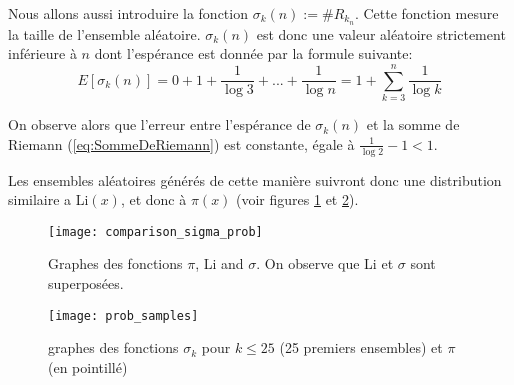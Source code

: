 \documentclass[../main.tex]{report}
\begin{document}
Nous allons aussi introduire la fonction $\sigma_k(n) := \# R_{k_n}$. Cette fonction mesure la taille de l'ensemble aléatoire.\newline
$\sigma_k(n)$ est donc une valeur aléatoire strictement inférieure à $n$ dont l'espérance est donnée par la formule suivante:
\begin{equation}
\label{eq:esperance}
E[\sigma_k(n)] = 0 + 1 + \frac{1}{\log 3} + ... + \frac{1}{\log n}
= 1 + \sum_{k=3}^{n} \frac{1}{\log k}
\end{equation}

On observe alors que l'erreur entre l'espérance de $\sigma_k(n)$ et la somme de Riemann (\ref{eq:SommeDeRiemann}) est constante, égale à
$\frac{1}{\log 2}- 1 < 1$.

Les ensembles aléatoires générés de cette manière suivront donc une distribution similaire a Li$(x)$, et donc à $\pi(x)$
(voir figures \ref{fig:comparison_sigma_prob} et \ref{fig:prob_sample}).

\begin{figure}[H]
\texttt{[image: comparison\_sigma\_prob]}

\caption{Graphes des fonctions $\pi$, Li and $\sigma$. On observe que Li et $\sigma$ sont superposées.}
\label{fig:comparison_sigma_prob}
\end{figure}

\begin{figure}[H]
	\centering
	\texttt{[image: prob\_samples]}
	\caption{graphes des fonctions $\sigma_k$ pour $k \leq 25$ (25 premiers ensembles) et $\pi$ (en pointillé)}
	\label{fig:prob_sample}
\end{figure}
\end{document}
